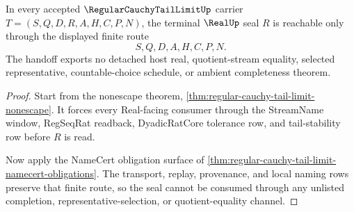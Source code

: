 \begin{theorem}
\label{thm:regular-cauchy-tail-limit-real-seal-handoff}
In every accepted $\RegularCauchyTailLimitUp$ carrier $T=(S,Q,D,R,A,H,C,P,N)$, the terminal $\RealUp$ seal $R$ is reachable only through the displayed finite route
$$
S,Q,D,A,H,C,P,N .
$$
The handoff exports no detached host real, quotient-stream equality, selected representative, countable-choice schedule, or ambient completeness theorem.
\end{theorem}
\begin{proof}
Start from the nonescape theorem, \autoref{thm:regular-cauchy-tail-limit-nonescape}. It forces every Real-facing consumer through the StreamName window, RegSeqRat readback, DyadicRatCore tolerance row, and tail-stability row before $R$ is read.

Now apply the NameCert obligation surface of \autoref{thm:regular-cauchy-tail-limit-namecert-obligations}. The transport, replay, provenance, and local naming rows preserve that finite route, so the seal cannot be consumed through any unlisted completion, representative-selection, or quotient-equality channel.
\end{proof}




